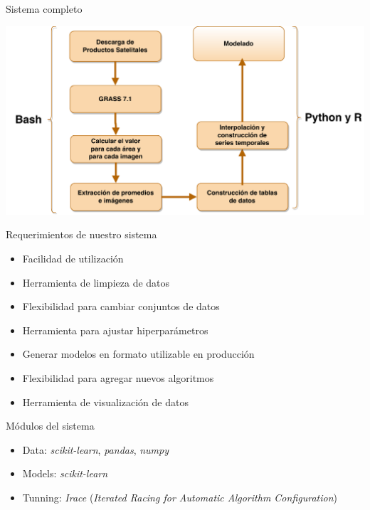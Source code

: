 \documentclass[10pt]{beamer}
\begin{document}
\begin{frame}{Sistema completo}
  \begin{center}
    \includegraphics[width=1\textwidth]{sistema_datos}
  \end{center}
\end{frame}


\begin{frame}{Requerimientos de nuestro sistema}
  \begin{itemize}[<+->]
    \item Facilidad de utilización
    \item Herramienta de limpieza de datos
    \item Flexibilidad para cambiar conjuntos de datos
    \item Herramienta para ajustar hiperparámetros
    \item Generar modelos en formato utilizable en producción
    \item Flexibilidad para agregar nuevos algoritmos
    \item Herramienta de visualización de datos
  \end{itemize}
\end{frame}

\begin{frame}{Módulos del sistema}
  \begin{itemize}[<+->]
    \item Data: \textit{scikit-learn}, \textit{pandas}, \textit{numpy}
    \item Models: \textit{scikit-learn}
    \item Tunning: \textit{Irace} (\textit{Iterated Racing for Automatic Algorithm Configuration})
  \end{itemize}
\end{frame}
\end{document}
